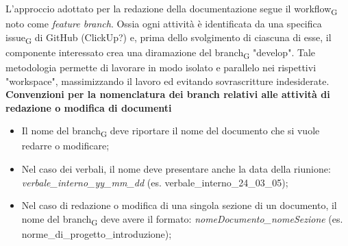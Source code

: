 L'approccio adottato per la redazione della documentazione segue il {workflow\textsubscript{G}} noto come \textit{feature branch}.
Ossia ogni attività è identificata da una specifica {issue\textsubscript{G}} di GitHub (ClickUp?) e, prima dello svolgimento di
ciascuna di esse, il componente interessato crea una diramazione del {branch\textsubscript{G}} "develop". Tale metodologia
permette di lavorare in modo isolato e parallelo nei rispettivi "workspace", massimizzando il lavoro ed evitando sovrascritture indesiderate.
\textbf{Convenzioni per la nomenclatura dei branch relativi alle attività di redazione o modifica di documenti} \label{convenzioni_nomenclatura}
\begin{itemize}
    \item Il nome del {branch\textsubscript{G}} deve riportare il nome del documento che si vuole redarre o modificare;
    \item Nel caso dei verbali, il nome deve presentare anche la data della riunione: \textit{verbale\_interno\_yy\_mm\_dd} (es. verbale\_interno\_24\_03\_05);
    \item Nel caso di redazione o modifica di una singola sezione di un documento, il nome del {branch\textsubscript{G}} deve avere il formato:
    \textit{nomeDocumento\_nomeSezione} (es. norme\_di\_progetto\_introduzione);
\end{itemize}

